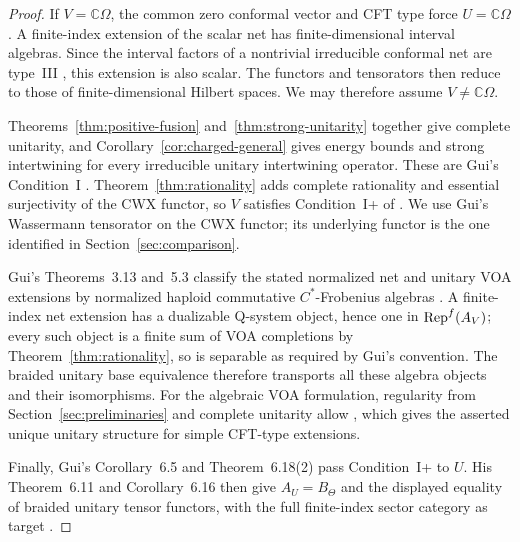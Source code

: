 \begin{proof}
If $V=\mathbb C\Omega$, the common zero conformal vector and CFT type
force $U=\mathbb C\Omega$. A finite-index extension of the scalar net
has finite-dimensional interval algebras. Since the interval factors of
a nontrivial irreducible conformal net are type~III
\cite[Section~3.3, property~(7)]{CKLW}, this extension is also scalar.
The functors and tensorators then reduce to those of finite-dimensional
Hilbert spaces. We may therefore assume $V\ne\mathbb C\Omega$.

Theorems~\ref{thm:positive-fusion} and~\ref{thm:strong-unitarity}
together give complete unitarity, and
Corollary~\ref{cor:charged-general} gives energy bounds and strong
intertwining for every irreducible unitary intertwining operator.
These are Gui's Condition~I
\cite[Definition~4.15]{GuiExtensions}. Theorem~\ref{thm:rationality}
adds complete rationality and essential surjectivity of the CWX functor,
so $V$ satisfies Condition~I+ of
\cite[Definition~6.17]{GuiExtensions}. We use Gui's Wassermann tensorator
on the CWX functor; its underlying functor is the one identified in
Section~\ref{sec:comparison}.

Gui's Theorems~3.13 and~5.3 classify the stated normalized net and unitary
VOA extensions by normalized haploid commutative $C^*$-Frobenius algebras
\cite{GuiExtensions}. A finite-index net extension has a dualizable
Q-system object, hence one in $\operatorname{Rep}^f(A_V)$; every such object is a finite
sum of VOA completions by Theorem~\ref{thm:rationality}, so is separable
as required by Gui's convention. The braided unitary base equivalence
therefore transports all these algebra objects and their isomorphisms.
For the algebraic VOA formulation, regularity from
Section~\ref{sec:preliminaries} and complete unitarity allow
\cite[Theorem~4.7]{CGGH}, which gives the asserted unique unitary
structure for simple CFT-type extensions.

Finally, Gui's Corollary~6.5 and Theorem~6.18(2) pass Condition~I+ to
$U$. His Theorem~6.11 and Corollary~6.16 then give $A_U=B_\Theta$ and
the displayed equality of braided unitary tensor functors, with the full
finite-index sector category as target \cite{GuiExtensions}.
\end{proof}
